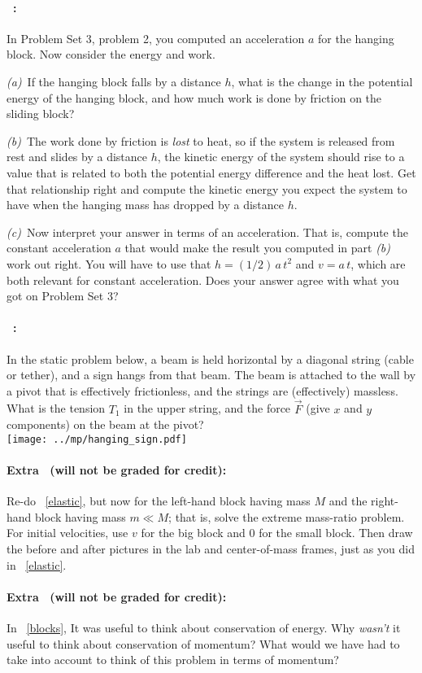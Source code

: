 \documentclass[12pt]{article}
\begin{document}
\paragraph{\problemname~\theproblem:}\label{blocks}%
In Problem Set 3, problem 2, you computed an acceleration $a$ for the
hanging block. Now consider the energy and work.

\textsl{(a)}~If the hanging block falls by a distance $h$, what is
the change in the potential energy of the hanging block, and how much
work is done by friction on the sliding block?

\textsl{(b)}~The work done by friction is \emph{lost} to heat, so if
the system is released from rest and slides by a distance $h$, the
kinetic energy of the system should rise to a value that is related to both the
potential energy difference and the heat lost. Get that relationship
right and compute the kinetic energy you expect the system to have
when the hanging mass has dropped by a distance $h$.

\textsl{(c)}~Now interpret your answer in terms of an acceleration.
That is, compute the constant acceleration $a$ that would make the
result you computed in part \textsl{(b)} work out right. You will have
to use that $h = (1/2)\,a\,t^2$ and $v=a\,t$, which are both relevant
for constant acceleration. Does your answer agree with what you got on
Problem Set 3?

\paragraph{\problemname~\theproblem:}%
In the static problem below, a beam is held horizontal by a diagonal
string (cable or tether), and a sign hangs from that beam. The beam is
attached to the wall by a pivot that is effectively frictionless, and
the strings are (effectively) massless. What is the tension $T_1$ in
the upper string, and the force $\vec{F}$ (give $x$ and $y$
components) on the beam at the pivot?
\\ \texttt{[image: ../mp/hanging\_sign.pdf]}

\paragraph{Extra \problemname\ (will not be graded for credit):}%
Re-do \problemname~\ref{elastic}, but now for the left-hand block having
mass $M$ and the right-hand block having mass $m\ll M$; that is, solve
the extreme mass-ratio problem. For initial velocities, use $v$ for
the big block and $0$ for the small block. Then draw the before and
after pictures in the lab and center-of-mass frames, just as you did
in \problemname~\ref{elastic}.

\paragraph{Extra \problemname\ (will not be graded for credit):}%
In \problemname~\ref{blocks}, It was useful to think about
conservation of energy. Why \emph{wasn't} it useful to think about
conservation of momentum? What would we have had to take into account
to think of this problem in terms of momentum?
\end{document}
